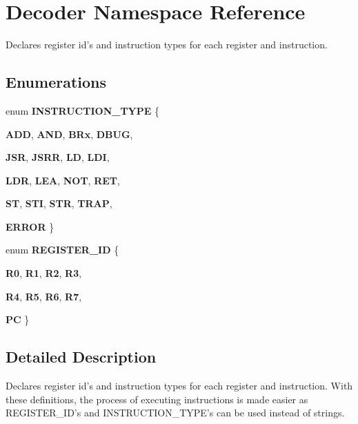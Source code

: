 \hypertarget{namespaceDecoder}{
\section{Decoder Namespace Reference}
\label{namespaceDecoder}
}


Declares register id's and instruction types for each register and instruction.  


\subsection*{Enumerations}
\begin{DoxyCompactItemize}
\item 
enum {\bfseries INSTRUCTION\_\-TYPE} \{ \par
{\bfseries ADD}, 
{\bfseries AND}, 
{\bfseries BRx}, 
{\bfseries DBUG}, 
\par
{\bfseries JSR}, 
{\bfseries JSRR}, 
{\bfseries LD}, 
{\bfseries LDI}, 
\par
{\bfseries LDR}, 
{\bfseries LEA}, 
{\bfseries NOT}, 
{\bfseries RET}, 
\par
{\bfseries ST}, 
{\bfseries STI}, 
{\bfseries STR}, 
{\bfseries TRAP}, 
\par
{\bfseries ERROR}
 \}
\item 
enum {\bfseries REGISTER\_\-ID} \{ \par
{\bfseries R0}, 
{\bfseries R1}, 
{\bfseries R2}, 
{\bfseries R3}, 
\par
{\bfseries R4}, 
{\bfseries R5}, 
{\bfseries R6}, 
{\bfseries R7}, 
\par
{\bfseries PC}
 \}
\end{DoxyCompactItemize}


\subsection{Detailed Description}
Declares register id's and instruction types for each register and instruction. With these definitions, the process of executing instructions is made easier as REGISTER\_\-ID's and INSTRUCTION\_\-TYPE's can be used instead of strings. 